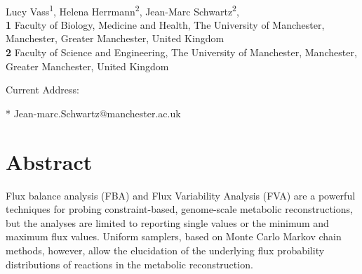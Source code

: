 \documentclass[10pt,letterpaper]{article}
\begin{document}
\vspace*{0.2in}

\begin{flushleft}
{\Large
\textbf{} %
}
\newline
\\
Lucy Vass\textsuperscript{1\textcurrency}, %
Helena Herrmann\textsuperscript{2}, %
Jean-Marc Schwartz\textsuperscript{2},
\\
\bigskip
\textbf{1} Faculty of Biology, Medicine and Health, The University of Manchester, Manchester, Greater Manchester, United Kingdom
\\
\textbf{2} Faculty of Science and Engineering, The University of Manchester, Manchester, Greater Manchester, United Kingdom
\\
\bigskip



\textcurrency Current Address: %


* Jean-marc.Schwartz@manchester.ac.uk

\end{flushleft}
\section*{Abstract}
Flux balance analysis (FBA) and Flux Variability Analysis (FVA) are a powerful techniques for probing constraint-based, genome-scale metabolic reconstructions, but the analyses are limited to reporting single values or the minimum and maximum flux values. Uniform samplers, based on Monte Carlo Markov chain methods, however, allow the elucidation of the underlying flux probability distributions of reactions in the metabolic reconstruction.
\end{document}
